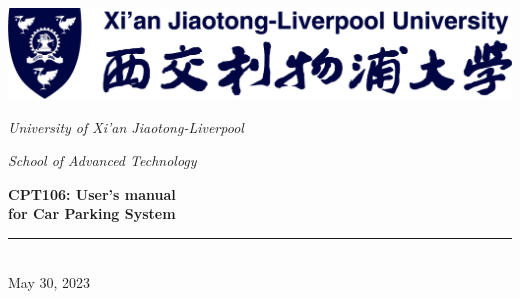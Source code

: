 
\thispagestyle{fancy}
\fancyfoot{}
\renewcommand{\headrulewidth}{0pt}

\begin{center}
	\includegraphics*[scale = 0.3]{pics/XJTLU.png}\par
	\slshape{\LARGE University of Xi'an Jiaotong-Liverpool}\\[2.5ex]\par
	\hfill\par
	\slshape{\Large School of Advanced Technology}\\[10ex]\par
	\hfill
	
	\textsf{\textup{\Huge \bfseries CPT106: User's manual\\[1.5ex] for Car Parking System }}\\[2ex]\par
	\noindent \rule[-1ex]{\textwidth}{2.5pt}\\[10ex]
	
	
	\noindent \textup{\Large May 30, 2023}
\end{center}
\clearpage

\endinput